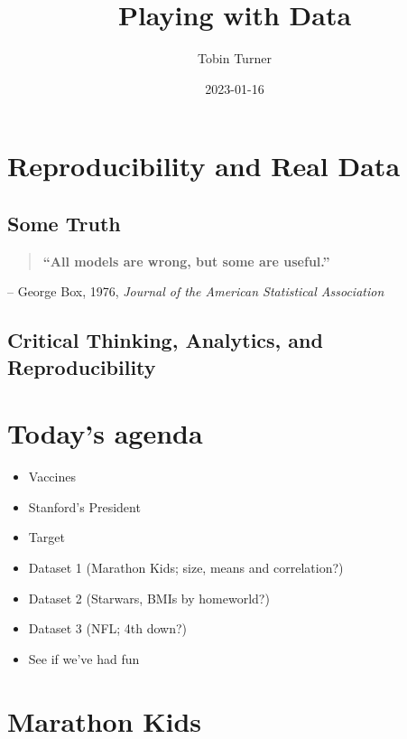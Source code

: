 \documentclass[
]{book}
\title{Playing with Data}
\author{Tobin Turner}
\date{2023-01-16}
\providecommand{\tightlist}{%
  \setlength{\itemsep}{0pt}\setlength{\parskip}{0pt}}
\begin{document}
\maketitle

{
\setcounter{tocdepth}{1}
\tableofcontents
}
\hypertarget{reproducibility-and-real-data}{%
\chapter{Reproducibility and Real Data}\label{reproducibility-and-real-data}}

\hypertarget{some-truth}{%
\section{Some Truth}\label{some-truth}}

\begin{quote}
\textbf{``All models are wrong, but some are useful.''}
\end{quote}

-- George Box, 1976, \emph{Journal of the American Statistical Association}

\hypertarget{critical-thinking-analytics-and-reproducibility}{%
\section{Critical Thinking, Analytics, and Reproducibility}\label{critical-thinking-analytics-and-reproducibility}}

\hypertarget{todays-agenda}{%
\chapter{Today's agenda}\label{todays-agenda}}

\begin{itemize}
\tightlist
\item
  Vaccines
\item
  Stanford's President
\item
  Target
\item
  Dataset 1 (Marathon Kids; size, means and correlation?)
\item
  Dataset 2 (Starwars, BMIs by homeworld?)
\item
  Dataset 3 (NFL; 4th down?)
\item
  See if we've had fun
\end{itemize}

\hypertarget{marathon-kids}{%
\chapter{Marathon Kids}\label{marathon-kids}}
\end{document}
